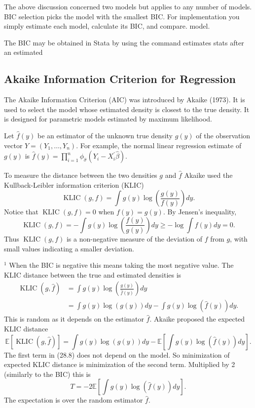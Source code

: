 \documentclass[10pt]{article}
\begin{document}
The above discussion concerned two models but applies to any number of models. BIC selection picks the model with the smallest BIC. For implementation you simply estimate each model, calculate its BIC, and compare. model.

The BIC may be obtained in Stata by using the command estimates stats after an estimated

\subsection{Akaike Information Criterion for Regression}
The Akaike Information Criterion (AIC) was introduced by Akaike (1973). It is used to select the model whose estimated density is closest to the true density. It is designed for parametric models estimated by maximum likelihood.

Let $\widehat{f}(y)$ be an estimator of the unknown true density $g(y)$ of the observation vector $Y=\left(Y_{1}, \ldots, Y_{n}\right)$. For example, the normal linear regression estimate of $g(y)$ is $\widehat{f}(y)=\prod_{i=1}^{n} \phi_{\widehat{\sigma}}\left(Y_{i}-X_{i}^{\prime} \widehat{\beta}\right)$.

To measure the distance between the two densities $g$ and $\widehat{f}$ Akaike used the Kullback-Leibler information criterion (KLIC)
$$
\operatorname{KLIC}(g, f)=\int g(y) \log \left(\frac{g(y)}{f(y)}\right) d y .
$$
Notice that $\operatorname{KLIC}(g, f)=0$ when $f(y)=g(y)$. By Jensen's inequality,
$$
\operatorname{KLIC}(g, f)=-\int g(y) \log \left(\frac{f(y)}{g(y)}\right) d y \geq-\log \int f(y) d y=0 .
$$
Thus $\operatorname{KLIC}(g, f)$ is a non-negative measure of the deviation of $f$ from $g$, with small values indicating a smaller deviation.

${ }^{1}$ When the BIC is negative this means taking the most negative value. The KLIC distance between the true and estimated densities is
$$
\begin{aligned}
\operatorname{KLIC}(g, \widehat{f}) &=\int g(y) \log \left(\frac{g(y)}{\widehat{f}(y)}\right) d y \\
&=\int g(y) \log (g(y)) d y-\int g(y) \log (\widehat{f}(y)) d y .
\end{aligned}
$$
This is random as it depends on the estimator $\widehat{f}$. Akaike proposed the expected KLIC distance
$$
\mathbb{E}[\operatorname{KLIC}(g, \widehat{f})]=\int g(y) \log (g(y)) d y-\mathbb{E}\left[\int g(y) \log (\widehat{f}(y)) d y\right] .
$$
The first term in (28.8) does not depend on the model. So minimization of expected KLIC distance is minimization of the second term. Multiplied by 2 (similarly to the BIC) this is
$$
T=-2 \mathbb{E}\left[\int g(y) \log (\widehat{f}(y)) d y\right] .
$$
The expectation is over the random estimator $\widehat{f}$.
\end{document}
